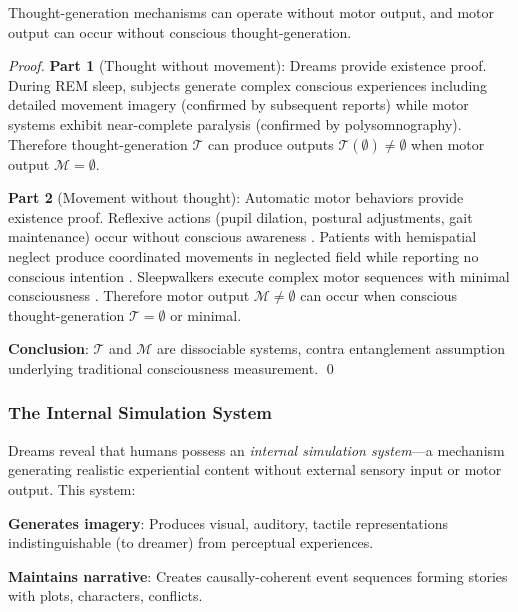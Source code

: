 \documentclass[11pt,onecolumn]{article}
\begin{document}
\begin{theorem}
\label{thm:dissociation}
Thought-generation mechanisms can operate without motor output, and motor output can occur without conscious thought-generation.
\end{theorem}

\begin{proof}
\textbf{Part 1} (Thought without movement): Dreams provide existence proof. During REM sleep, subjects generate complex conscious experiences including detailed movement imagery (confirmed by subsequent reports) while motor systems exhibit near-complete paralysis (confirmed by polysomnography). Therefore thought-generation $\mathcal{T}$ can produce outputs $\mathcal{T}(\emptyset) \neq \emptyset$ when motor output $\mathcal{M} = \emptyset$.

\textbf{Part 2} (Movement without thought): Automatic motor behaviors provide existence proof. Reflexive actions (pupil dilation, postural adjustments, gait maintenance) occur without conscious awareness \citep{dietz2002human}. Patients with hemispatial neglect produce coordinated movements in neglected field while reporting no conscious intention \citep{marshall2001spatial}. Sleepwalkers execute complex motor sequences with minimal consciousness \citep{zadra2013sleepwalking}. Therefore motor output $\mathcal{M} \neq \emptyset$ can occur when conscious thought-generation $\mathcal{T} = \emptyset$ or minimal.

\textbf{Conclusion}: $\mathcal{T}$ and $\mathcal{M}$ are dissociable systems, contra entanglement assumption underlying traditional consciousness measurement. \qed
\end{proof}

\subsubsection{The Internal Simulation System}

Dreams reveal that humans possess an \textit{internal simulation system}---a mechanism generating realistic experiential content without external sensory input or motor output. This system:

\textbf{Generates imagery}: Produces visual, auditory, tactile representations indistinguishable (to dreamer) from perceptual experiences.

\textbf{Maintains narrative}: Creates causally-coherent event sequences forming stories with plots, characters, conflicts.
\end{document}
